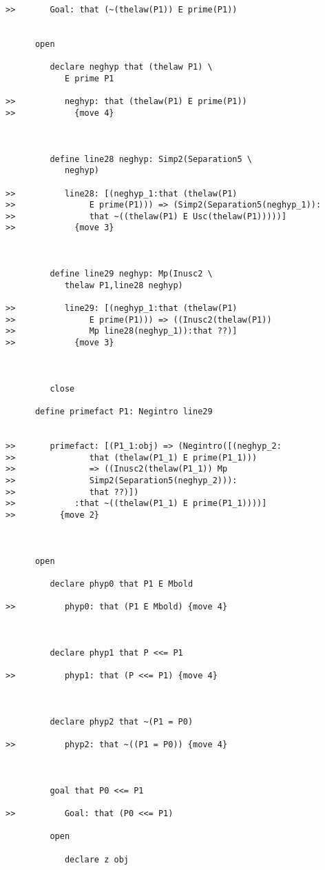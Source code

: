 \documentclass[12pt]{article}
\begin{document}
\begin{verbatim}
>>       Goal: that (~(thelaw(P1)) E prime(P1))


      open

         declare neghyp that (thelaw P1) \
            E prime P1

>>          neghyp: that (thelaw(P1) E prime(P1))
>>            {move 4}



         define line28 neghyp: Simp2(Separation5 \
            neghyp)

>>          line28: [(neghyp_1:that (thelaw(P1)
>>               E prime(P1))) => (Simp2(Separation5(neghyp_1)):
>>               that ~((thelaw(P1) E Usc(thelaw(P1)))))]
>>            {move 3}



         define line29 neghyp: Mp(Inusc2 \
            thelaw P1,line28 neghyp)

>>          line29: [(neghyp_1:that (thelaw(P1)
>>               E prime(P1))) => ((Inusc2(thelaw(P1))
>>               Mp line28(neghyp_1)):that ??)]
>>            {move 3}



         close

      define primefact P1: Negintro line29


>>       primefact: [(P1_1:obj) => (Negintro([(neghyp_2:
>>               that (thelaw(P1_1) E prime(P1_1)))
>>               => ((Inusc2(thelaw(P1_1)) Mp
>>               Simp2(Separation5(neghyp_2))):
>>               that ??)])
>>            :that ~((thelaw(P1_1) E prime(P1_1))))]
>>         {move 2}



      open

         declare phyp0 that P1 E Mbold

>>          phyp0: that (P1 E Mbold) {move 4}



         declare phyp1 that P <<= P1

>>          phyp1: that (P <<= P1) {move 4}



         declare phyp2 that ~(P1 = P0)

>>          phyp2: that ~((P1 = P0)) {move 4}



         goal that P0 <<= P1

>>          Goal: that (P0 <<= P1)

         open

            declare z obj


\end{verbatim}
\end{document}
